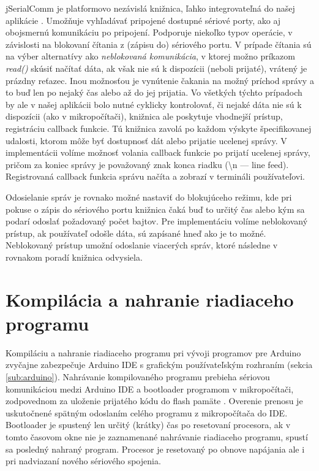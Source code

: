 jSerialComm je platformovo nezávislá knižnica, ľahko integrovateľná do našej aplikácie \cite{jSerialComm}. Umožňuje vyhľadávať pripojené dostupné sériové porty, ako aj obojsmernú komunikáciu po pripojení. Podporuje niekoľko typov operácie, v závislosti na blokovaní čítania z (zápisu do) sériového portu. V prípade čítania sú na výber alternatívy ako \textit{neblokovaná komunikácia}, v ktorej možno príkazom \textit{read()} skúsiť načítať dáta, ak však nie sú k dispozícii (neboli prijaté), vrátený je prázdny reťazec. Inou možnosťou je vynútenie čakania na možný príchod správy a to buď len po nejaký čas alebo až do jej prijatia. Vo všetkých týchto prípadoch by ale v našej aplikácii bolo nutné cyklicky kontrolovať, či nejaké dáta nie sú k dispozícii (ako v mikropočítači), knižnica ale poskytuje vhodnejší prístup, registráciu callback funkcie. Tú knižnica zavolá po každom výskyte špecifikovanej udalosti, ktorom môže byť dostupnosť dát alebo prijatie ucelenej správy. V implementácii volíme možnosť volania callback funkcie po prijatí ucelenej správy, pričom za koniec správy je považovaný znak konca riadku (\textbackslash n --- line feed). Registrovaná callback funkcia správu načíta a zobrazí v termináli používateľovi.

Odosielanie správ je rovnako možné nastaviť do blokujúceho režimu, kde pri pokuse o zápis do sériového portu knižnica čaká buď to určitý čas alebo kým sa podarí odoslať požadovaný počet bajtov. Pre implementáciu volíme neblokovaný prístup, ak používateľ odošle dáta, sú zapísané hneď ako je to možné. Neblokovaný prístup umožní odoslanie viacerých správ, ktoré následne v rovnakom poradí knižnica odvysiela.


\section{Kompilácia a nahranie riadiaceho programu}
\label{sub:arduinoIDE}
Kompiláciu a nahranie riadiaceho programu pri vývoji programov pre Arduino zvyčajne zabezpečuje Arduino IDE s grafickým používateľským rozhraním (sekcia \ref{sub:arduino}). Nahrávanie kompilovaného programu prebieha sériovou komunikáciou medzi Arduino IDE a bootloader programom v mikropočítači, zodpovednom za uloženie prijatého kódu do flash pamäte \cite{sketchUpload}. Overenie prenosu je uskutočnené spätným odoslaním celého programu z mikropočítača do IDE. Bootloader je spustený len určitý (krátky) čas po resetovaní procesora, ak v tomto časovom okne nie je zaznamenané nahrávanie riadiaceho programu, spustí sa posledný nahraný program. Procesor je resetovaný po obnove napájania ale i pri nadviazaní nového sériového spojenia.

